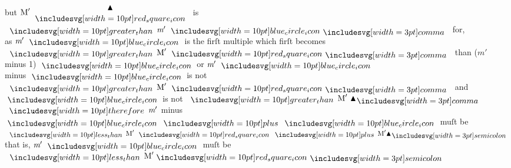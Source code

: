 \documentclass[11pt,preview]{standalone}
\begin{document}
\begin{center}
    but $\text{M}'\ \triandsquare$ is $\bgt \textit{m}'\ \bluecircle \bcomma$ for,\\
    as $\textit{m}'\ \bluecircle$ is the firſt multiple which firſt becomes $\bgt \text{M}'\ \redsquare \bcomma$ than ($\textit{m}'$ minus 1) $\bluecircle$ or $\textit{m}'\ \bluecircle$\\
    minus $\bluecircle$ is not $\bgt \text{M}'\ \redsquare \bcomma$ and $\bluecircle$ is not $\bgt \text{M}'\ \blacktriangle \bcomma$\\
    $\btherefore \textit{m}'$ minus $\bluecircle \bplus \bluecircle$ muſt be $\blt \text{M}'\ \redsquare \bplus \text{M}' \blacktriangle \bsemicolon$\\
    that is, $\textit{m}'\ \bluecircle$ muſt be $\blt \text{M}' \redsquare \bsemicolon$\\
\end{center}
\end{document}
